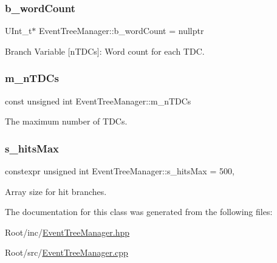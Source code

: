 \subsubsection{\texorpdfstring{b\+\_\+word\+Count}{b\_wordCount}}
{\footnotesize\ttfamily U\+Int\+\_\+t$\ast$ Event\+Tree\+Manager\+::b\+\_\+word\+Count = nullptr\hspace{0.3cm}{\ttfamily [private]}}



Branch Variable \mbox{[}n\+T\+D\+Cs\mbox{]}\+: Word count for each T\+DC. 

\mbox{\label{class_event_tree_manager_a87c672aa1531b362b15eddf11cab00c8}} 
\subsubsection{\texorpdfstring{m\+\_\+n\+T\+D\+Cs}{m\_nTDCs}}
{\footnotesize\ttfamily const unsigned int Event\+Tree\+Manager\+::m\+\_\+n\+T\+D\+Cs\hspace{0.3cm}{\ttfamily [private]}}



The maximum number of T\+D\+Cs. 

\mbox{\label{class_event_tree_manager_aab35ad52374d52149bde894c8af7a8c5}} 
\subsubsection{\texorpdfstring{s\+\_\+hits\+Max}{s\_hitsMax}}
{\footnotesize\ttfamily constexpr unsigned int Event\+Tree\+Manager\+::s\+\_\+hits\+Max = 500\hspace{0.3cm}{\ttfamily [static]}, {\ttfamily [private]}}



Array size for hit branches. 



The documentation for this class was generated from the following files\+:\begin{DoxyCompactItemize}
\item 
Root/inc/\hyperlink{_event_tree_manager_8hpp}{Event\+Tree\+Manager.\+hpp}\item 
Root/src/\hyperlink{_event_tree_manager_8cpp}{Event\+Tree\+Manager.\+cpp}\end{DoxyCompactItemize}
